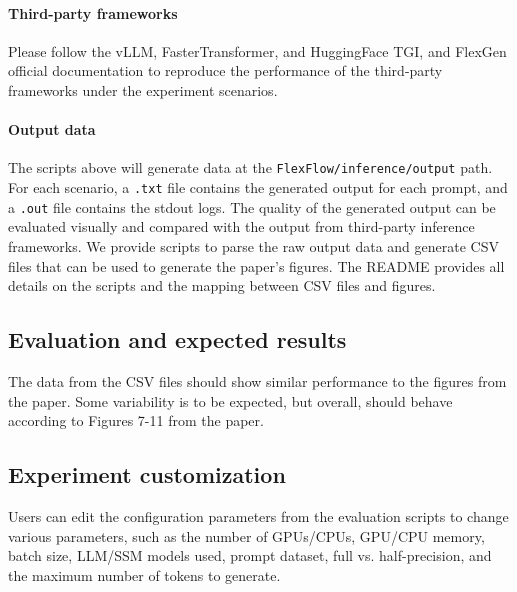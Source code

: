 \paragraph{Third-party frameworks}
Please follow the vLLM, FasterTransformer, and HuggingFace TGI, and FlexGen official documentation to reproduce the performance of the third-party frameworks under the experiment scenarios.

\paragraph{Output data}
The scripts above will generate data at the \texttt{FlexFlow/inference/output} path. For each scenario, a \texttt{.txt} file contains the generated output for each prompt, and a \texttt{.out} file contains the stdout logs. The quality of the generated output can be evaluated visually and compared with the output from third-party inference frameworks.
We provide scripts to parse the raw output data and generate CSV files that can be used to generate the paper's figures. The README provides all details on the scripts and the mapping between CSV files and figures.

\subsection{Evaluation and expected results}
The data from the CSV files should show similar performance to the figures from the paper. Some variability is to be expected, but overall, \sys should behave according to Figures 7-11 from the paper. 

\subsection{Experiment customization}
Users can edit the configuration parameters from the evaluation scripts to change various parameters, such as the number of GPUs/CPUs, GPU/CPU memory, batch size, LLM/SSM models used, prompt dataset, full vs. half-precision, and the maximum number of tokens to generate.

